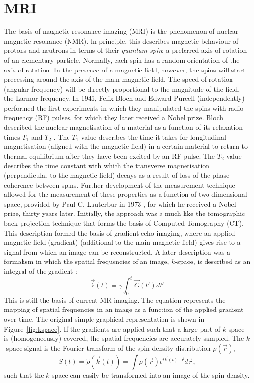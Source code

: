 \section*{MRI}
The basis of magnetic resonance imaging (MRI) is the phenomenon of nuclear magnetic resonance (NMR). In principle, this describes magnetic behaviour of protons and neutrons in terms of their \emph{quantum spin}: a preferred axis of rotation of an elementary particle. Normally, each spin has a random orientation of the axis of rotation. In the presence of a magnetic field, however, the spins will start precessing around the axis of the main magnetic field. The speed of rotation (angular frequency) will be directly proportional to the magnitude of the field, the Larmor frequency. In 1946, Felix Bloch and Edward Purcell (independently) performed the first experiments in which they manipulated the spins with radio frequency (RF) pulses, for which they later received a Nobel prize. Bloch described the nuclear magnetisation of a material as a function of its relaxation times $T_1$ and $T_2$ \cite{Bloch1946}. The $T_1$ value describes the time it takes for longitudinal magnetisation (aligned with the magnetic field) in a certain material to return to thermal equilibrium after they have been excited by an RF pulse. The $T_2$ value describes the time constant with which the transverse magnetisation (perpendicular to the magnetic field) decays as a result of loss of the phase coherence between spins. Further development of the measurement technique allowed for the measurement of these properties as a function of two-dimensional space, provided by Paul C. Lauterbur in 1973 \cite{Lauterbur1973}, for which he received a Nobel prize, thirty years later. Initially, the approach was a much like the tomographic back projection technique that forms the basis of Computed Tomography (CT). This description formed the basis of gradient echo imaging, where an applied magnetic field (gradient) (additional to the main magnetic field) gives rise to a signal from which an image can be reconstructed. A later description was a formalism in which the spatial frequencies of an image, $k$-space, is described as an integral of the gradient \cite{Twieg1983,Ljunggren1983}:
\begin{equation}
\vec{k}(t)=\gamma \int_{0}^{t}\vec{G}(t')dt'
\end{equation}
This is still the basis of current MR imaging. The equation represents the mapping of spatial frequencies in an image as a function of the applied gradient over time. The original simple graphical representation is shown in Figure~\ref{fig:kspace}. If the gradients are applied such that a large part of $k$-space is (homogeneously) covered, the spatial frequencies are accurately sampled. The $k$-space signal is the Fourier transform of the spin density distribution $\rho (\vec{r})$,
\begin{equation}
S(t)=\hat{\rho}(\vec{k}(t))=\int\rho(\vec{r})e^{i \vec{k}(t) \cdot \vec{r}}d\vec{r},
\end{equation}
such that the $k$-space can easily be transformed into an image of the spin density.


